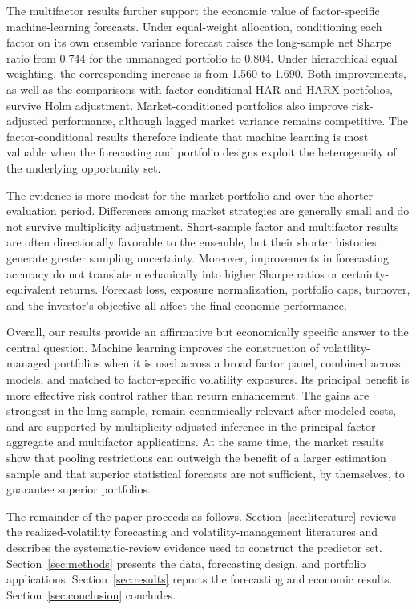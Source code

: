 \documentclass[preprint,12pt,authoryear]{elsarticle}
\begin{document}
The multifactor results further support the economic value of factor-specific machine-learning forecasts. Under equal-weight allocation, conditioning each factor on its own ensemble variance forecast raises the long-sample net Sharpe ratio from 0.744 for the unmanaged portfolio to 0.804. Under hierarchical equal weighting, the corresponding increase is from 1.560 to 1.690. Both improvements, as well as the comparisons with factor-conditional HAR and HARX portfolios, survive Holm adjustment. Market-conditioned portfolios also improve risk-adjusted performance, although lagged market variance remains competitive. The factor-conditional results therefore indicate that machine learning is most valuable when the forecasting and portfolio designs exploit the heterogeneity of the underlying opportunity set.

The evidence is more modest for the market portfolio and over the shorter evaluation period. Differences among market strategies are generally small and do not survive multiplicity adjustment. Short-sample factor and multifactor results are often directionally favorable to the ensemble, but their shorter histories generate greater sampling uncertainty. Moreover, improvements in forecasting accuracy do not translate mechanically into higher Sharpe ratios or certainty-equivalent returns. Forecast loss, exposure normalization, portfolio caps, turnover, and the investor's objective all affect the final economic performance.

Overall, our results provide an affirmative but economically specific answer to the central question. Machine learning improves the construction of volatility-managed portfolios when it is used across a broad factor panel, combined across models, and matched to factor-specific volatility exposures. Its principal benefit is more effective risk control rather than return enhancement. The gains are strongest in the long sample, remain economically relevant after modeled costs, and are supported by multiplicity-adjusted inference in the principal factor-aggregate and multifactor applications. At the same time, the market results show that pooling restrictions can outweigh the benefit of a larger estimation sample and that superior statistical forecasts are not sufficient, by themselves, to guarantee superior portfolios.

The remainder of the paper proceeds as follows. Section~\ref{sec:literature} reviews the realized-volatility forecasting and volatility-management literatures and describes the systematic-review evidence used to construct the predictor set. Section~\ref{sec:methods} presents the data, forecasting design, and portfolio applications. Section~\ref{sec:results} reports the forecasting and economic results. Section~\ref{sec:conclusion} concludes.
\end{document}
